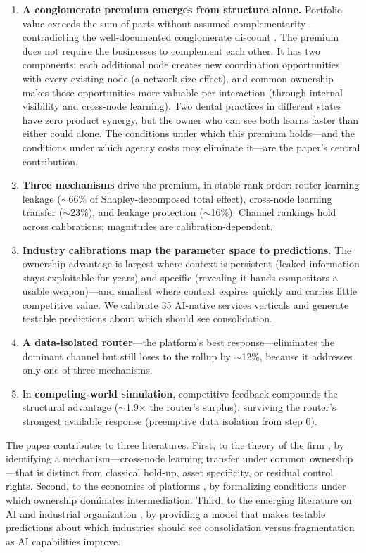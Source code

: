 \documentclass[12pt]{article}
\theoremstyle{definition}
\begin{document}
\begin{enumerate}[leftmargin=*]
\item \textbf{A conglomerate premium emerges from structure alone.} Portfolio value exceeds the sum of parts without assumed complementarity---contradicting the well-documented conglomerate discount \citep{berger1995}. The premium does not require the businesses to complement each other. It has two components: each additional node creates new coordination opportunities with every existing node (a network-size effect), and common ownership makes those opportunities more valuable per interaction (through internal visibility and cross-node learning). Two dental practices in different states have zero product synergy, but the owner who can see both learns faster than either could alone. The conditions under which this premium holds---and the conditions under which agency costs may eliminate it---are the paper's central contribution.

\item \textbf{Three mechanisms} drive the premium, in stable rank order: router learning leakage ($\sim$66\% of Shapley-decomposed total effect), cross-node learning transfer ($\sim$23\%), and leakage protection ($\sim$16\%). Channel rankings hold across calibrations; magnitudes are calibration-dependent.

\item \textbf{Industry calibrations map the parameter space to predictions.} The ownership advantage is largest where context is persistent (leaked information stays exploitable for years) and specific (revealing it hands competitors a usable weapon)---and smallest where context expires quickly and carries little competitive value. We calibrate 35 AI-native services verticals and generate testable predictions about which should see consolidation.

\item \textbf{A data-isolated router}---the platform's best response---eliminates the dominant channel but still loses to the rollup by $\sim$12\%, because it addresses only one of three mechanisms.

\item In \textbf{competing-world simulation}, competitive feedback compounds the structural advantage ($\sim$1.9$\times$ the router's surplus), surviving the router's strongest available response (preemptive data isolation from step 0).
\end{enumerate}

The paper contributes to three literatures. First, to the theory of the firm \citep{coase1937, williamson1975, grossman1986, hart1990}, by identifying a mechanism---cross-node learning transfer under common ownership---that is distinct from classical hold-up, asset specificity, or residual control rights. Second, to the economics of platforms \citep{rochet2003, parker2016}, by formalizing conditions under which ownership dominates intermediation. Third, to the emerging literature on AI and industrial organization \citep{agrawal2018, brynjolfsson2017}, by providing a model that makes testable predictions about which industries should see consolidation versus fragmentation as AI capabilities improve.
\end{document}

